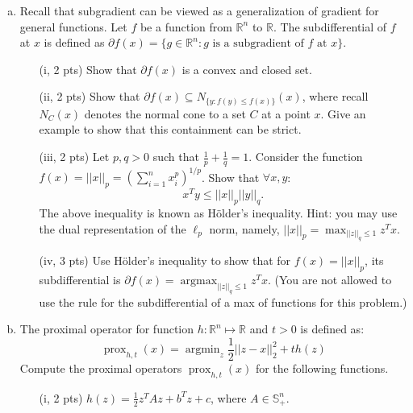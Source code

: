\documentclass{article}
\theoremstyle{remark}
\theoremstyle{definition}
\newcommand{\argmin}{\mathop{\mathrm{argmin}}}
\newcommand{\argmax}{\mathop{\mathrm{argmax}}}
\newcommand{\prox}{\operatorname{prox}}
\def\R{\mathbb{R}}
\begin{document}
\begin{enumerate}[(a)]
    \item   Recall that subgradient can be viewed as a generalization of gradient for general functions. Let $f$ be a function from $\R^n$ to $\R$. The subdifferential of $f$ at $x$ is defined as $\partial f(x) = \{g\in\R^n: g\text{ is a subgradient of $f$ at $x$}\}$.
        \begin{enumerate}
            \item[(i, 2 pts)]  Show that $\partial f(x)$ is a convex and closed
              set. 

            \item[(ii, 2 pts)] Show that $\partial f(x) \subseteq N_{\{y: f(y) \leq f(x) \}}(x)$, where recall $N_C(x)$ denotes the normal cone to a set $C$ at a point $x$. Give an example to show that this containment can be strict.

            \item[(iii, 2 pts)] Let $p, q > 0$ such that $\frac{1}{p} +
              \frac{1}{q} = 1$. Consider the function $f(x) = ||x||_p=(\sum_{i=1}^n
              x_i^p)^{1/p}$. Show that $\forall x, y$:
            $$x^Ty \leq ||x||_p||y||_q.$$
            The above inequality is known as H\"{o}lder's inequality.  Hint: you
            may use the dual representation of the $\ell_p$ norm, namely,
            $||x||_p = \max_{||z||_q \leq 1} z^T x$.

            \item [(iv, 3 pts)] Use H\"{o}lder's inequality to show
              that for $f(x)=||x||_p$, its subdifferential is $\partial f(x) =
              \argmax_{||z||_q \leq 1} z^T x$. (You are not allowed to use the
              rule for the subdifferential of a max of functions for this
              problem.)  
        \end{enumerate}

    \item   The proximal operator for function $h: \R^n\mapsto\R$ and $t > 0$ is defined as:
            $$\prox_{h,t}(x) = \argmin_{z}\frac{1}{2}||z-x||_2^2 + th(z)$$
            Compute the proximal operators $\prox_{h,t}(x)$ for the following functions.

            \begin{enumerate}
                \item[(i, 2 pts)]  $h(z) = \frac{1}{2}z^TAz + b^Tz + c$, where $A\in\mathbb{S}_+^n$.


\end{enumerate}
\end{enumerate}
\end{document}
